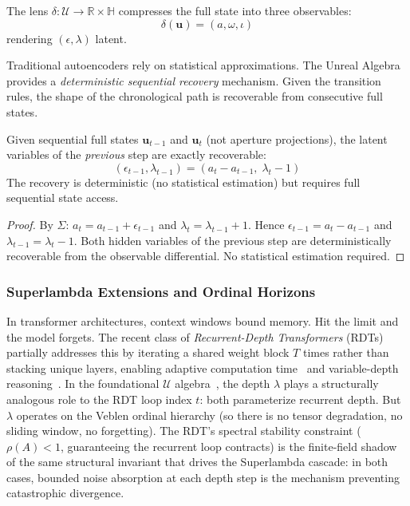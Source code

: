 \begin{definition}
The lens $\delta : \mathcal{U} \to \mathbb{R} \times \mathbb{H}$ compresses the full state into three observables:
$$\delta(\mathbf{u}) = (a, \omega, \iota)$$
rendering $({\epsilon, \lambda})$ latent.
\end{definition}

Traditional autoencoders rely on statistical approximations. The Unreal Algebra provides a \emph{deterministic sequential recovery} mechanism. Given the transition rules, the shape of the chronological path is recoverable from consecutive full states.

\begin{theorem}
Given sequential full states $\mathbf{u}_{t-1}$ and $\mathbf{u}_t$ (not aperture projections), the latent variables of the \emph{previous} step are exactly recoverable:
$$(\epsilon_{t-1}, \lambda_{t-1}) = (a_t - a_{t-1},\; \lambda_t - 1)$$
The recovery is deterministic (no statistical estimation) but requires full sequential state access.
\end{theorem}

\begin{proof}
By $\Sigma$: $a_t = a_{t-1} + \epsilon_{t-1}$ and $\lambda_t = \lambda_{t-1} + 1$. Hence $\epsilon_{t-1} = a_t - a_{t-1}$ and $\lambda_{t-1} = \lambda_t - 1$. Both hidden variables of the previous step are deterministically recoverable from the observable differential. No statistical estimation required. \qedhere
\end{proof}

\subsubsection{Superlambda Extensions and Ordinal Horizons}

In transformer architectures, context windows bound memory. Hit the limit and the model forgets. The recent class of \emph{Recurrent-Depth Transformers} (RDTs) partially addresses this by iterating a shared weight block $T$ times rather than stacking unique layers, enabling adaptive computation time~\cite{Graves2016ACT} and variable-depth reasoning~\cite{Dehghani2019UT,Bae2024RRT}. In the foundational $\mathcal{U}$ algebra~\cite{larue_lc}, the depth $\lambda$ plays a structurally analogous role to the RDT loop index $t$: both parameterize recurrent depth. But $\lambda$ operates on the Veblen ordinal hierarchy (so there is no tensor degradation, no sliding window, no forgetting). The RDT's spectral stability constraint ($\rho(A) < 1$, guaranteeing the recurrent loop contracts) is the finite-field shadow of the same structural invariant that drives the Superlambda cascade: in both cases, bounded noise absorption at each depth step is the mechanism preventing catastrophic divergence.

